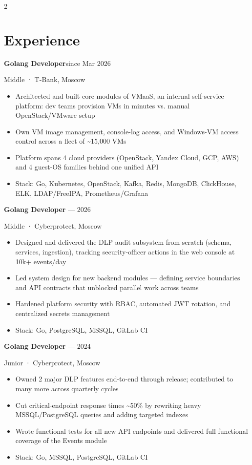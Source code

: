 \documentclass[10pt,a4paper]{article}
\newcommand{\role}[3]{%
  \par\noindent
  {\fontsize{10}{11}\bfseries\selectfont #1}\hfill{\fontsize{9}{10.5}\color{muted}\selectfont #3}\par
  {\fontsize{9}{10.5}\color{muted}\selectfont #2}\par
}
\begin{document}
\begin{paracol}{2}
\section*{Experience}
\fontsize{8.5}{9.0}\selectfont

\role{Golang Developer}{Middle · T-Bank, Moscow}{since Mar 2026}
\begin{itemize}
  \item Architected and built core modules of VMaaS, an internal self-service platform: dev teams provision VMs in minutes vs. manual OpenStack/VMware setup
  \item Own VM image management, console-log access, and Windows-VM access control across a fleet of \textasciitilde15,000 VMs
  \item Platform spans 4 cloud providers (OpenStack, Yandex Cloud, GCP, AWS) and 4 guest-OS families behind one unified API
  \item Stack: Go, Kubernetes, OpenStack, Kafka, Redis, MongoDB, ClickHouse, ELK, LDAP/FreeIPA, Prometheus/Grafana
\end{itemize}
\vspace{1pt}

\role{Golang Developer}{Middle · Cyberprotect, Moscow}{2024 --- 2026}
\begin{itemize}
  \item Designed and delivered the DLP audit subsystem from scratch (schema, services, ingestion), tracking security-officer actions in the web console at 10k+ events/day
  \item Led system design for new backend modules --- defining service boundaries and API contracts that unblocked parallel work across teams
  \item Hardened platform security with RBAC, automated JWT rotation, and centralized secrets management
  \item Stack: Go, PostgreSQL, MSSQL, GitLab CI
\end{itemize}
\vspace{1pt}

\role{Golang Developer}{Junior · Cyberprotect, Moscow}{2023 --- 2024}
\begin{itemize}
  \item Owned 2 major DLP features end-to-end through release; contributed to many more across quarterly cycles
  \item Cut critical-endpoint response times \textasciitilde50\% by rewriting heavy MSSQL/PostgreSQL queries and adding targeted indexes
  \item Wrote functional tests for all new API endpoints and delivered full functional coverage of the Events module
  \item Stack: Go, MSSQL, PostgreSQL, GitLab CI
\end{itemize}
\vspace{1pt}


\end{paracol}
\end{document}
